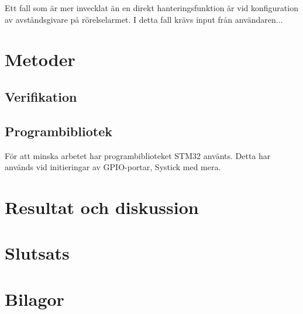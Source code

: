 \documentclass{article}
\begin{document}
Ett fall som är mer invecklat än en direkt hanteringsfunktion är vid konfiguration av avståndsgivare på rörelselarmet. I detta fall krävs input från användaren... 





\section{Metoder}
\label{stm}
\subsection{Verifikation}
\subsection{Programbibliotek}
\label{stm}
För att minska arbetet har programbiblioteket STM32\cite{stm}
använts. Detta har används vid initieringar av GPIO-portar, Systick med mera.

\section{Resultat och diskussion} %
\section{Slutsats}





\section{Bilagor}
\end{document}
